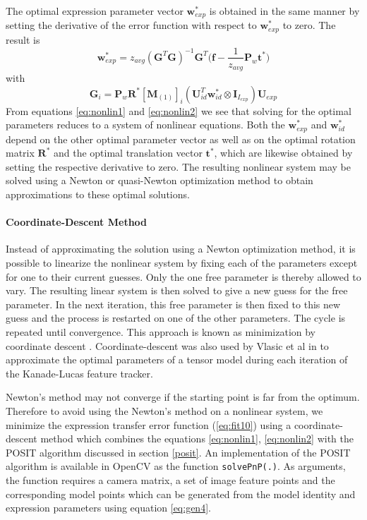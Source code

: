 \documentclass[11pt,a4paper]{report}
\begin{document}
The optimal expression parameter vector $\mathbf{w}^*_{exp}$ is obtained in the
same manner by setting the derivative of the error function with respect to
$\mathbf{w}^*_{exp}$ to zero. The result is 
\begin{equation}\label{eq:nonlin2}
\mathbf{w}^*_{exp} = z_{avg}(\mathbf{G}^T\mathbf{G})^{-1}\mathbf{G}^T\bigl(\mathbf{f} - \frac{1}{z_{avg}}\mathbf{P}_w\mathbf{t}^*\bigr)
\end{equation}
with 
\begin{equation}\label{eq:G}
\mathbf{G}_i =
\mathbf{P}_w\mathbf{R}^*[\mathbf{M}_{(1)}]_{i}(\mathbf{U}_{id}^T\mathbf{w}^*_{id}
\otimes \mathbf{I}_{I_{exp}})\mathbf{U}_{exp}
\end{equation}
From equations \ref{eq:nonlin1} and \ref{eq:nonlin2} we see that solving for
the optimal parameters reduces to a system of nonlinear equations. Both the
$\mathbf{w}^*_{exp}$ and $\mathbf{w}^*_{id}$ depend on the other optimal parameter vector as
well as on the optimal rotation matrix $\mathbf{R}^*$ and the optimal translation
vector $\mathbf{t}^*$, which are likewise obtained by setting the respective
derivative to zero. The resulting nonlinear system may be solved using a Newton or
quasi-Newton optimization method to obtain approximations to these optimal solutions.

\paragraph{Coordinate-Descent Method}
Instead of approximating the solution using a Newton optimization method, it is
possible to linearize the nonlinear system by fixing each of the parameters
except for one to their current guesses. Only the one free parameter is thereby
allowed to vary. The resulting linear system is then solved
to give a new guess for the free parameter. In the next iteration, this free parameter is then fixed to
this new guess and the process is restarted on one of the other parameters. The cycle
is repeated until convergence. This approach is known as minimization by coordinate
descent \cite{Press1992}. Coordinate-descent was also used by Vlasic et al in \cite{faceTransfer05}
to approximate the optimal parameters of a tensor model during each iteration of
the Kanade-Lucas feature tracker.

Newton's method may not converge if the starting point is far from the
optimum. Therefore to avoid using the Newton's method on a nonlinear system, we
minimize the expression transfer error function (\ref{eq:fit10}) using
a coordinate-descent method which combines the equations
\ref{eq:nonlin1}, \ref{eq:nonlin2} with the POSIT algorithm discussed in section
\ref{posit}. An implementation of the POSIT algorithm is available in OpenCV as
the function \texttt{solvePnP(.)}. As arguments, the function requires a camera matrix, a set of image
feature points and the corresponding model points which can be generated from
the model identity and expression parameters using equation \ref{eq:gen4}.
\end{document}
